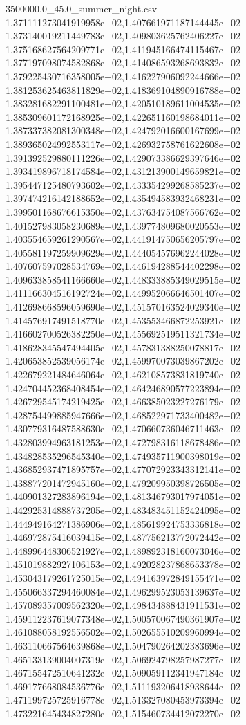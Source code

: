 \begin{filecontents*}{3500000.0_45.0_summer_night.csv}
1.371111273041919958e+02,1.407661971187144445e+02
1.373140019211449783e+02,1.409803625762406227e+02
1.375168627564209771e+02,1.411945166474115467e+02
1.377197098074582868e+02,1.414086593268693832e+02
1.379225430716358005e+02,1.416227906092244666e+02
1.381253625463811829e+02,1.418369104890916788e+02
1.383281682291100481e+02,1.420510189611004535e+02
1.385309601172168925e+02,1.422651160198684011e+02
1.387337382081300348e+02,1.424792016600167699e+02
1.389365024992553117e+02,1.426932758761622608e+02
1.391392529880111226e+02,1.429073386629397646e+02
1.393419896718174584e+02,1.431213900149659821e+02
1.395447125480793602e+02,1.433354299268585237e+02
1.397474216142188652e+02,1.435494583932468231e+02
1.399501168676615350e+02,1.437634754087566762e+02
1.401527983058230689e+02,1.439774809680020553e+02
1.403554659261290567e+02,1.441914750656205797e+02
1.405581197259909629e+02,1.444054576962244028e+02
1.407607597028534769e+02,1.446194288544402298e+02
1.409633858541166660e+02,1.448333885349029515e+02
1.411166304516192724e+02,1.449952066646501407e+02
1.412698668596059690e+02,1.451570163524029340e+02
1.414576917491518770e+02,1.453553466872253921e+02
1.416602700526382250e+02,1.455692519511321734e+02
1.418628345547494405e+02,1.457831388250078817e+02
1.420653852539056174e+02,1.459970073039867202e+02
1.422679221484646064e+02,1.462108573831819740e+02
1.424704452368408454e+02,1.464246890577223894e+02
1.426729545174219425e+02,1.466385023227276179e+02
1.428754499885947666e+02,1.468522971733400482e+02
1.430779316487588630e+02,1.470660736046711463e+02
1.432803994963181253e+02,1.472798316118678486e+02
1.434828535296545340e+02,1.474935711900398019e+02
1.436852937471895757e+02,1.477072923343312141e+02
1.438877201472945160e+02,1.479209950398726505e+02
1.440901327283896194e+02,1.481346793017974051e+02
1.442925314888737205e+02,1.483483451152424095e+02
1.444949164271386906e+02,1.485619924753336818e+02
1.446972875416039415e+02,1.487756213772072442e+02
1.448996448306521927e+02,1.489892318160073046e+02
1.451019882927106153e+02,1.492028237868653378e+02
1.453043179261725015e+02,1.494163972849155471e+02
1.455066337294460084e+02,1.496299523053139637e+02
1.457089357009562320e+02,1.498434888431911531e+02
1.459112237619077348e+02,1.500570067490361907e+02
1.461088058192556502e+02,1.502655510209960994e+02
1.463110667564639868e+02,1.504790264202383696e+02
1.465133139004007319e+02,1.506924798257987277e+02
1.467155472510641232e+02,1.509059112341947184e+02
1.469177668084536776e+02,1.511193206418938644e+02
1.471199725725916778e+02,1.513327080453973394e+02
1.473221645434827280e+02,1.515460734412072270e+02

\end{filecontents*}
